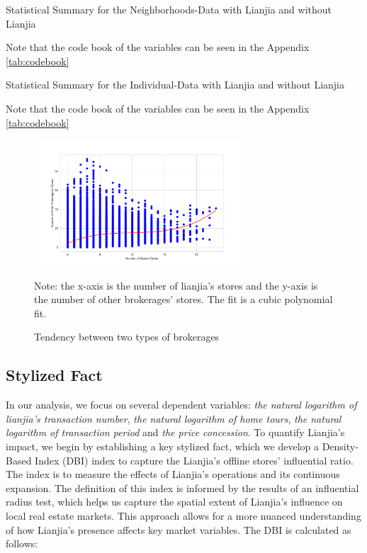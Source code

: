 \documentclass[11pt]{article}
\begin{document}
\begin{table}[htb!]
    \centering
    \begin{tiny}
    \caption{Statistical Summary for the Neighborhoods-Data with Lianjia and without Lianjia}
    
    \label{tab:statistical_district}

    Note that the code book of the variables can be seen in the Appendix \ref{tab:codebook}
    \end{tiny}
\end{table}

\begin{table}[htb!]
  \centering
  \begin{tiny}
  \caption{Statistical Summary for the Individual-Data with Lianjia and without Lianjia}
  
  \label{tab:statistical_individual}

  Note that the code book of the variables can be seen in the Appendix \ref{tab:codebook}
  \end{tiny}  
\end{table}

\begin{figure}
    \centering
    \includegraphics[width=0.7\textwidth]{../figures/scatter_plot_with_two_brokerages.pdf}
    \caption{Tendency between two types of brokerages}
    \label{fig:same_distribution}
    Note: the x-axis is the number of lianjia's stores and the y-axis is the number of other brokerages' stores. The fit is a cubic polynomial fit.
\end{figure}


\subsection{Stylized Fact} \label{subsec:stylized_fact}

In our analysis, we focus on several dependent variables: \emph{the natural logarithm of lianjia's transaction number}, \emph{the natural logarithm of home tours}, \emph{the natural logarithm of transaction period} and \emph{the price concession}. To quantify Lianjia's impact, we begin by establishing a key stylized fact, which we develop a Density-Based Index (DBI) index to capture the Lianjia's offline stores' influential ratio. The index is to measure the effects of Lianjia's operations and its continuous expansion. The definition of this index is informed by the results of an influential radius test, which helps us capture the spatial extent of Lianjia's influence on local real estate markets. This approach allows for a more nuanced understanding of how Lianjia's presence affects key market variables. The DBI is calculated as follows:
\end{document}
